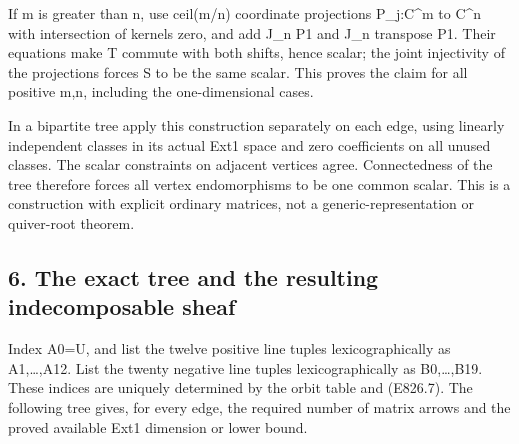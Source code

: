 If m is greater than n, use ceil(m/n) coordinate projections P\_j:C\^{}m to
C\^{}n with intersection of kernels zero, and add J\_n P1 and J\_n transpose
P1. Their equations make T commute with both shifts, hence scalar; the joint
injectivity of the projections forces S to be the same scalar. This proves
the claim for all positive m,n, including the one-dimensional cases.

In a bipartite tree apply this construction separately on each edge, using
linearly independent classes in its actual Ext1 space and zero coefficients
on all unused classes. The scalar constraints on adjacent vertices agree.
Connectedness of the tree therefore forces all vertex endomorphisms to be
one common scalar. This is a construction with explicit ordinary matrices,
not a generic-representation or quiver-root theorem.

\subsection{6. The exact tree and the resulting indecomposable
sheaf}\label{SF-E826:the-exact-tree-and-the-resulting-indecomposable-sheaf}

Index A0=U, and list the twelve positive line tuples lexicographically as
A1,\ldots,A12. List the twenty negative line tuples lexicographically as
B0,\ldots,B19. These indices are uniquely determined by the orbit table and
(E826.7). The following tree gives, for every edge, the required number of
matrix arrows and the proved available Ext1 dimension or lower bound.

